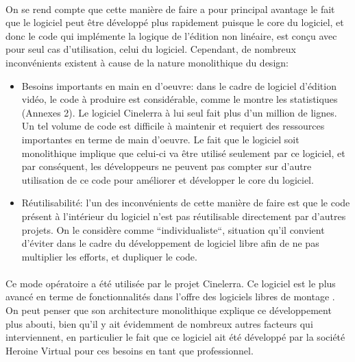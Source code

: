 \paragraph{}

On se rend compte que cette manière de faire a pour principal avantage
le fait que le logiciel peut être développé plus rapidement puisque
le core du logiciel, et donc le code qui implémente la logique de
l'édition non linéaire, est conçu avec pour seul cas d'utilisation,
celui du logiciel. Cependant, de nombreux inconvénients existent à
cause de la nature monolithique du design:

\begin{itemize}

  \item  {Besoins importants en main en d'oeuvre: dans le cadre de logiciel
    d'édition vidéo, le code à produire est considérable, comme
    le montre les statistiques (Annexes 2). Le logiciel Cinelerra
    à lui seul fait plus d'un million de lignes. Un tel volume
    de code est difficile à maintenir et requiert des ressources
    importantes en terme de main d'oeuvre. Le fait que le logiciel
    soit monolithique implique que celui-ci va
    être utilisé seulement par ce logiciel, et par conséquent, les
    développeurs ne peuvent pas compter sur d'autre utilisation de ce
    code pour améliorer et développer le core du logiciel.}

  \item  {Réutilisabilité: l'un des inconvénients de cette manière
  de faire est que le code
    présent à l'intérieur du logiciel n'est pas réutilisable
    directement par d'autres projets. On le considère comme
    ``individualiste``, situation qu'il convient d'éviter dans le cadre
    du développement de logiciel libre afin de ne pas multiplier les
    efforts, et dupliquer le code.}

\end{itemize}

\paragraph{}

Ce mode opératoire a été utilisée par le projet Cinelerra. Ce
logiciel est le plus avancé en terme de fonctionnalités dans l'offre
des logiciels libres de montage . On peut penser que son architecture
monolithique explique ce développement plus
abouti, bien qu'il y ait évidemment de nombreux autres facteurs
qui interviennent, en particulier le fait que ce logiciel ait été
développé par la société Heroine Virtual pour ces besoins en tant
que professionnel.

